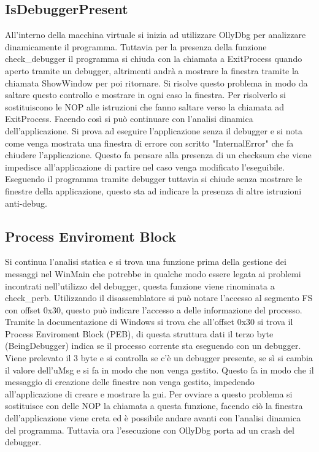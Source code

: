 \documentclass[a4paper,10pt]{article}
\begin{document}
\subsection{IsDebuggerPresent}
All'interno della macchina virtuale si inizia ad utilizzare OllyDbg per analizzare dinamicamente il programma. Tuttavia per la presenza della funzione check\_debugger il programma si chiuda con la chiamata a ExitProcess quando aperto tramite un debugger, altrimenti andrà a mostrare la finestra tramite la chiamata ShowWindow per poi ritornare. Si risolve questo problema in modo da saltare questo controllo e mostrare in ogni caso la finestra. Per risolverlo si sostituiscono le NOP alle istruzioni che fanno saltare verso la chiamata ad ExitProcess.
 Facendo così si può continuare con l'analisi dinamica dell'applicazione. Si prova ad eseguire l'applicazione senza il debugger e si nota come venga mostrata una finestra di errore con scritto "InternalError" che fa chiudere l'applicazione. Questo fa pensare alla presenza di un checksum che viene impedisce all'applicazione di partire nel caso venga modificato l'eseguibile.  Eseguendo il programma tramite debugger tuttavia si chiude senza mostrare le finestre della applicazione, questo sta ad indicare la presenza di altre istruzioni anti-debug. 

\subsection{Process Enviroment Block}
Si continua l'analisi statica e si trova una funzione prima della gestione dei messaggi nel WinMain che potrebbe in qualche modo essere legata ai problemi incontrati nell'utilizzo del debugger, questa funzione viene rinominata a check\_perb. Utilizzando il disassemblatore si può notare l'accesso al segmento FS con offset 0x30, questo può indicare l'accesso a delle informazione del processo. Tramite la documentazione di Windows si trova che all'offset 0x30 si trova il Process Enviroment Block (PEB), di questa struttura dati il terzo byte (BeingDebugger) indica se il processo corrente sta eseguendo con un debugger. Viene prelevato il 3 byte e si controlla se c'è un debugger presente, se sì si cambia il valore dell'uMsg e si fa in modo che non venga gestito. Questo fa in modo che il messaggio di creazione delle finestre non venga gestito, impedendo all'applicazione di creare e mostrare la gui. Per ovviare a questo problema si sostituisce con delle NOP la chiamata a questa funzione, facendo ciò la finestra dell'applicazione viene creta ed è possibile andare avanti con l'analisi dinamica del programma. Tuttavia ora l'esecuzione con OllyDbg porta ad un crash del debugger.
\end{document}
